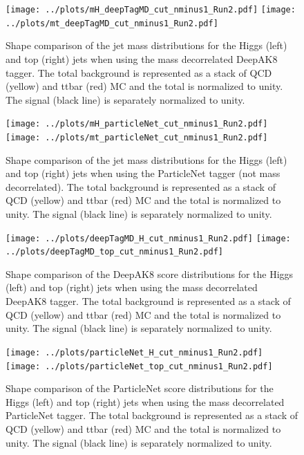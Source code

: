 \documentclass[10pt]{article}
\begin{document}
\begin{figure}
    \texttt{[image: ../plots/mH\_deepTagMD\_cut\_nminus1\_Run2.pdf]}
    \texttt{[image: ../plots/mt\_deepTagMD\_cut\_nminus1\_Run2.pdf]}
    \label{figs:jetMassDAK8}
    \caption{Shape comparison of the jet mass distributions for the Higgs (left) and top (right) jets
    when using the mass decorrelated DeepAK8 tagger. The total background
    is represented as a stack of QCD (yellow) and ttbar (red) MC and the total is normalized to
    unity. The signal (black line) is separately normalized to unity.}
\end{figure}

\begin{figure}
    \texttt{[image: ../plots/mH\_particleNet\_cut\_nminus1\_Run2.pdf]}
    \texttt{[image: ../plots/mt\_particleNet\_cut\_nminus1\_Run2.pdf]}
    \label{figs:jetMassPN}
    \caption{Shape comparison of the jet mass distributions for the Higgs (left) and top (right) jets
    when using the ParticleNet tagger (not mass decorrelated). The total background
    is represented as a stack of QCD (yellow) and ttbar (red) MC and the total is normalized to
    unity. The signal (black line) is separately normalized to unity.}
\end{figure}

\begin{figure}
    \texttt{[image: ../plots/deepTagMD\_H\_cut\_nminus1\_Run2.pdf]}
    \texttt{[image: ../plots/deepTagMD\_top\_cut\_nminus1\_Run2.pdf]}
    \label{figs:jetDAK8}
    \caption{Shape comparison of the DeepAK8 score distributions for the Higgs (left) and top (right) jets
    when using the mass decorrelated DeepAK8 tagger. The total background
    is represented as a stack of QCD (yellow) and ttbar (red) MC and the total is normalized to
    unity. The signal (black line) is separately normalized to unity.}
\end{figure}

\begin{figure}
    \texttt{[image: ../plots/particleNet\_H\_cut\_nminus1\_Run2.pdf]}
    \texttt{[image: ../plots/particleNet\_top\_cut\_nminus1\_Run2.pdf]}
    \label{figs:jetPN}
    \caption{Shape comparison of the ParticleNet score distributions for the Higgs (left) and top (right) jets
    when using the mass decorrelated ParticleNet tagger. The total background
    is represented as a stack of QCD (yellow) and ttbar (red) MC and the total is normalized to
    unity. The signal (black line) is separately normalized to unity.}
\end{figure}
\end{document}
